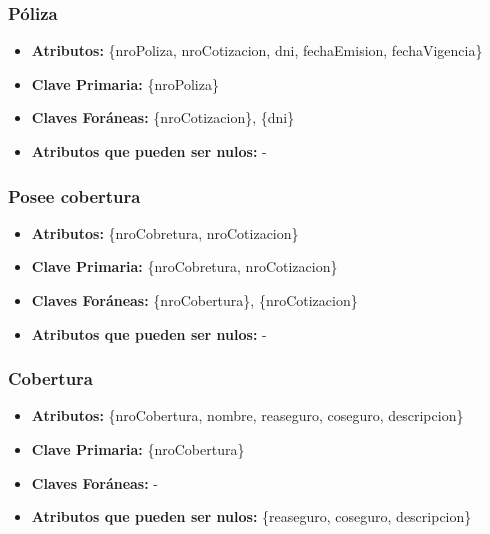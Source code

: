 \documentclass[a4paper,11pt]{article}
\begin{document}
\subsubsection{Póliza}

\begin{itemize}

	\item \textbf{Atributos:} \{nroPoliza, nroCotizacion, dni, fechaEmision, fechaVigencia\}

	\item \textbf{Clave Primaria:} \{nroPoliza\}

	\item \textbf{Claves Foráneas:} \{nroCotizacion\}, \{dni\}

	\item \textbf{Atributos que pueden ser nulos:} -
	
\end{itemize}

\subsubsection{Posee cobertura}

\begin{itemize}

	\item \textbf{Atributos:} \{nroCobretura, nroCotizacion\}

	\item \textbf{Clave Primaria:} \{nroCobretura, nroCotizacion\}
	
	\item \textbf{Claves Foráneas:} \{nroCobertura\}, \{nroCotizacion\}

	\item \textbf{Atributos que pueden ser nulos:} -
	
\end{itemize}

\subsubsection{Cobertura}

\begin{itemize}

	\item \textbf{Atributos:} \{nroCobertura, nombre, reaseguro, coseguro, descripcion\}

	\item \textbf{Clave Primaria:} \{nroCobertura\}
	
	\item \textbf{Claves Foráneas:} -

	\item \textbf{Atributos que pueden ser nulos:} \{reaseguro, coseguro, descripcion\} 
	
\end{itemize}
\end{document}
